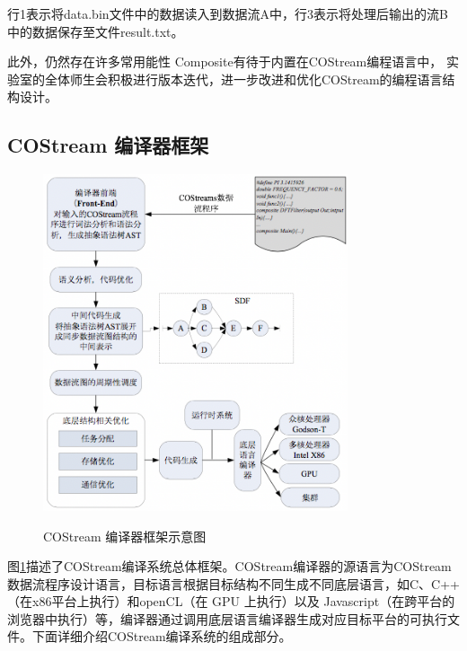 行1表示将data.bin文件中的数据读入到数据流A中，行3表示将处理后输出的流B中的数据保存至文件result.txt。

此外，仍然存在许多常用能性 Composite有待于内置在COStream编程语言中， 实验室的全体师生会积极进行版本迭代，进一步改进和优化COStream的编程语言结构设计。 

\subsection{COStream 编译器框架}

\begin{figure}[htbp]
  \centering
  \includegraphics[width=0.8\textwidth]{Img/Chap_Application/Yu/compiler.png}\\
  \caption{COStream 编译器框架示意图}\label{fig:compiler}
\end{figure}

图\ref{fig:compiler}描述了COStream编译系统总体框架。COStream编译器的源语言为COStream数据流程序设计语言，目标语言根据目标结构不同生成不同底层语言，如C、C++（在x86平台上执行）和openCL（在 GPU 上执行）以及 Javascript（在跨平台的浏览器中执行）等，编译器通过调用底层语言编译器生成对应目标平台的可执行文件。下面详细介绍COStream编译系统的组成部分。

